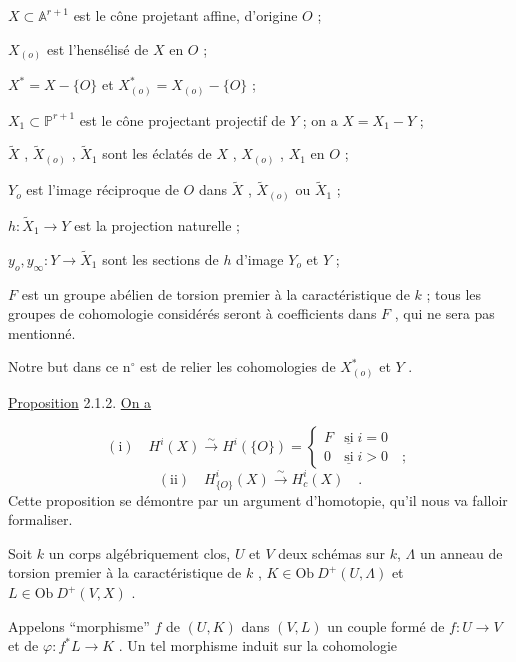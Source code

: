 $X \subset \mathbb{A}^{r+1}$ est le cône projetant affine, d'origine $O$ ;

$X_{(o)}$ est l'hensélisé de $X$ en $O$ ;

$X^* = X - \{O\}$ et $X^*_{(o)} = X_{(o)} - \{O\}$ ;

$X_1 \subset \mathbb{P}^{r+1}$ est le cône projectant projectif de $Y$ ; on a $X = X_1 - Y$ ;

$\widetilde{X}$ , $\widetilde{X}_{(o)}$ , $\widetilde{X}_1$ sont les éclatés de $X$ , $X_{(o)}$ , $X_1$ en $O$ ;

$Y_o$ est l'image réciproque de $O$ dans $\widetilde{X}$ , $\widetilde{X}_{(o)}$ ou $\widetilde{X}_1$ ;

$h : \widetilde{X}_1 \to Y$ est la projection naturelle ;

$y_o , y_\infty : Y \to \widetilde{X}_1$ sont les sections de $h$ d'image $Y_o$ et $Y$ ;

$F$ est un groupe abélien de torsion premier à la caractéristique de $k$ ; tous les groupes de cohomologie considérés seront à coefficients dans $F$ , qui ne sera pas mentionné.

Notre but dans ce n$^{\circ}$ est de relier les cohomologies de $X^*_{(o)}$ et $Y$ .

\underline{Proposition} 2.1.2. \underline{On a}

\begin{equation*}
\mathrm{(i)} \quad H^i(X) \stackrel{\sim}{\longrightarrow} H^i(\{O\}) = \left\{ \begin{array}{ll} F & \underline{\mathrm{si}} \; i = 0 \\[1.5ex] 0 & \underline{\mathrm{si}} \; i > 0 \quad ; \end{array} \right.
\end{equation*}
\begin{equation*}
\mathrm{(ii)} \quad H^i_{\{O\}}(X) \stackrel{\sim}{\longrightarrow} H^i_c(X) \quad .
\end{equation*}
Cette proposition se démontre par un argument d'homotopie, qu'il nous va falloir formaliser.

Soit $k$ un corps algébriquement clos, $U$ et $V$ deux schémas sur $k$, $\Lambda$ un anneau de torsion premier à la caractéristique de $k$ , $K \in \mathrm{Ob}\ D^+(U,\Lambda)$ et $L \in \mathrm{Ob}\ D^+(V,X)$ .



Appelons ``morphisme'' $f$ de $(U,K)$ dans $(V,L)$ un couple formé de $f : U \to V$ et de $\varphi : f^*L \to K$ . Un tel morphisme induit sur la cohomologie

